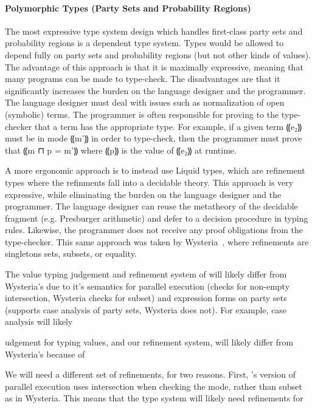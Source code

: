 \paragraph*{Polymorphic Types (Party Sets and Probability Regions)}

The most expressive type system design which handles first-class party sets
and probability regions is a dependent type system. Types would be allowed to
depend fully on party sets and probability regions (but not other kinds of values).
The advantage of this approach is that it is maximally expressive, meaning that
many programs can be made to type-check. The disadvantages are that it significantly
increases the burden on the language designer and the programmer. The language designer
must deal with issues such as normalization of open (symbolic) terms. The programmer
is often responsible for proving to the type-checker that a term has the appropriate type.
For example, if a given term ⸨e₂⸩ must be in mode ⸨m'⸩ in order to type-check, then the
programmer must prove that ⸨m ⊓ p = m'⸩ where ⸨p⸩ is the value of ⸨e₂⸩ at runtime.

A more ergonomic approach is to instead use Liquid types, which are refinement types
where the refinments fall into a decidable theory. This approach is very expressive,
while eliminating the burden on the language designer and the programmer. The language
designer can reuse the metatheory of the decidable fragment (e.g. Presburger arithmetic)
and defer to a decision procedure in typing rules. Likewise, the programmer does not receive
any proof obligations from the type-checker. This same approach was taken by Wysteria~\cite{todo},
where refinements are singletons sets, subsets, or equality.

The value typing judgement and refinement system of \lang will likely differ from Wysteria's
due to it's semantics for parallel execution (\lang checks for non-empty intersection, Wysteria
checks for subset) and expression forms on party sets (\lang supports case analysis of party sets,
Wysteria does not). For example, case analysis will likely

udgement for typing values, and our refinement system, will likely differ from Wysteria's
because of


We will need a different set of refinements, for two reasons. First, \lang's version of parallel
execution uses intersection when checking the mode, rather than subset as in Wysteria. This means
that the type system will likely need refinements for

